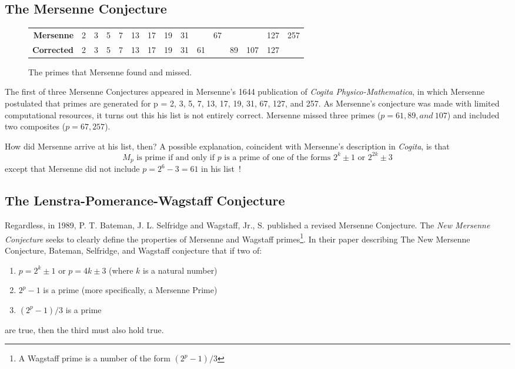 \subsection{The Mersenne Conjecture}
\begin{figure}
\begin{tabular}{rcccccccccccccc}
\textbf{Mersenne}&2&3&5&7&13&17&19&31&&67&&&127&257\\
\textbf{Corrected}&2&3&5&7&13&17&19&31&61&&89&107&127&
\end{tabular}
\caption{The primes that Mersenne found and missed.}
\label{fig:conj}
\end{figure}

The first of three Mersenne Conjectures appeared in Mersenne’s 1644 publication of 
\textit{Cogita Physico-Mathematica}, in which Mersenne postulated that primes are generated for p = 2, 3, 5,
7, 13, 17, 19, 31, 67, 127, and 257. As Mersenne's conjecture was made with limited computational
resources, it turns out this his list is not entirely correct.
Mersenne missed three primes ($p = 61, 89, and~107$) and included two composites ($p = 67, 257$).

How did Mersenne arrive at his list, then? A possible explanation, coincident with Mersenne's description in
\textit{Cogita}, is that
\begin{equation}
    M_p \text{ is prime if and only if $p$ is a prime of one of the forms } 2^k\pm1 \text{ or } 2^{2k}\pm3
\end{equation}
except that Mersenne did not include $p = 2^{6}-3 = 61$ in his list~\cite{newconjecture}!


\subsection{The Lenstra-Pomerance-Wagstaff Conjecture}

Regardless, in 1989, P. T. Bateman, J. L. Selfridge and Wagstaff, Jr., S. published a revised Mersenne Conjecture.
The \textit{New Mersenne Conjecture} seeks to clearly define the properties of Mersenne and Wagstaff primes\footnote{A Wagstaff prime is a number of the form $(2^p-1)/3$}.
In their paper describing The New Mersenne Conjecture, Bateman, Selfridge, and Wagstaff conjecture that if two of: 
\begin{enumerate}
\item $p = 2^k \pm 1$ or $p = 4k \pm 3$ (where $k$ is a natural number)
\item $2^p - 1$ is a prime (more specifically, a Mersenne Prime)
\item $(2^p - 1)/3$ is a prime
\end{enumerate}
are true, then the third must also hold true.

